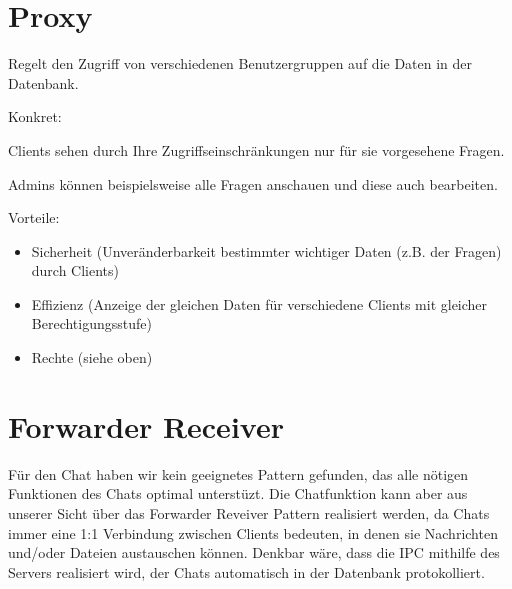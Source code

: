 \documentclass{scrreprt}
\begin{document}
\chapter{Proxy}

Regelt den Zugriff von verschiedenen Benutzergruppen auf die Daten in der Datenbank.

Konkret:

Clients sehen durch Ihre Zugriffseinschränkungen nur für sie vorgesehene Fragen.

Admins können beispielsweise alle Fragen anschauen und diese auch bearbeiten.

Vorteile:
\begin{itemize}
\item Sicherheit (Unveränderbarkeit bestimmter wichtiger Daten (z.B. der Fragen) durch Clients)
\item Effizienz (Anzeige der gleichen Daten für verschiedene Clients mit gleicher Berechtigungsstufe)
\item Rechte (siehe oben)
\end{itemize}


\chapter{Forwarder Receiver}
Für den Chat haben wir kein geeignetes Pattern gefunden, das alle nötigen Funktionen des Chats optimal unterstüzt. Die Chatfunktion kann aber aus unserer Sicht über das Forwarder Reveiver Pattern realisiert werden, da Chats immer eine 1:1 Verbindung zwischen Clients bedeuten, in denen sie Nachrichten und/oder Dateien austauschen können. Denkbar wäre, dass die IPC mithilfe des Servers realisiert wird, der Chats automatisch in der Datenbank protokolliert.
\end{document}
